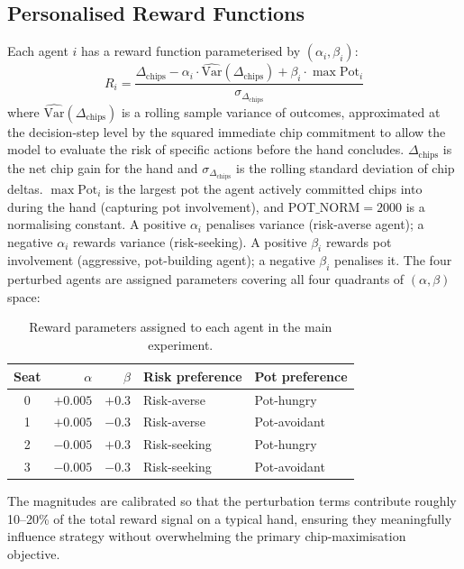 \documentclass{article}
\begin{document}
\subsection{Personalised Reward Functions}

Each agent $i$ has a reward function parameterised by $(\alpha_i, \beta_i)$:
\[
R_i = \frac{\Delta_{\text{chips}} - \alpha_i \cdot \widehat{\text{Var}}(\Delta_{\text{chips}}) + \beta_i \cdot \max\text{Pot}_i}{\sigma_{\Delta_{\text{chips}}}}
\]
where $\widehat{\text{Var}}(\Delta_{\text{chips}})$ is a rolling sample variance of outcomes, approximated at the decision-step level by the squared immediate chip commitment to allow the model to evaluate the risk of specific actions before the hand concludes. $\Delta_{\text{chips}}$ is the net chip gain for the hand and $\sigma_{\Delta_{\text{chips}}}$ is the rolling standard deviation of chip deltas. $\max\text{Pot}_i$ is the largest pot the agent actively committed chips into during the hand (capturing pot involvement), and $\text{POT\_NORM} = 2000$ is a normalising constant. A positive $\alpha_i$ penalises variance (risk-averse agent); a negative $\alpha_i$ rewards variance (risk-seeking). A positive $\beta_i$ rewards pot involvement (aggressive, pot-building agent); a negative $\beta_i$ penalises it. The four perturbed agents are assigned parameters covering all four quadrants of $(\alpha, \beta)$ space:

\begin{table}[h]
\caption{Reward parameters assigned to each agent in the main experiment.}
\label{tab:reward_params}
\centering
\begin{tabular}{crrll}
\toprule
Seat & $\alpha$ & $\beta$ & Risk preference & Pot preference \\
\midrule
0 & $+0.005$ & $+0.3$ & Risk-averse & Pot-hungry \\
1 & $+0.005$ & $-0.3$ & Risk-averse & Pot-avoidant \\
2 & $-0.005$ & $+0.3$ & Risk-seeking & Pot-hungry \\
3 & $-0.005$ & $-0.3$ & Risk-seeking & Pot-avoidant \\
\bottomrule
\end{tabular}
\end{table}

The magnitudes are calibrated so that the perturbation terms contribute roughly 10--20\% of the total reward signal on a typical hand, ensuring they meaningfully influence strategy without overwhelming the primary chip-maximisation objective.
\end{document}
